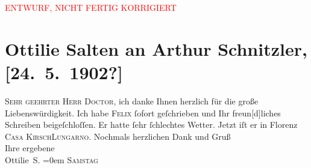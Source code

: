 
\begin{center}
            \textcolor{red}{ENTWURF, NICHT FERTIG KORRIGIERT}
                      \end{center}
            
         \renewcommand{\erwaehnteOrte}{Orte: Casa Kirsch, Wien}
         \renewcommand{\erwaehnteWerke}{}
               \section[Ottilie Salten an Arthur Schnitzler, {[}24. 5. 1902?{]}]{ Ottilie Salten an Arthur Schnitzler, {[}24. 5. 1902?{]}}\nopagebreak{}\rehead{ }\begin{ledgroupsized}[t]{13cm}\normalsize\beginnumbering \toendnotes[C]{\smallbreak\pagebreak[2]} 
\pstart
           \noindent{}{\pb}\textsc{Sehr geehrter Herr Doctor, } ich danke Ihnen herzlich für die große Liebenswürdigkeit. Ich habe \textsc{Felix} ſofort geſchrieben und Ihr
               freun{[}d{]}liches Schreiben beigeſchloſſen. Er hatte ſehr ſchlechtes
               Wetter. Jetzt iſt er in Florenz \textsc{Casa Kirsch}\textsc{Lungarno.}\pend
           \pstart
           Nochmals herzlichen Dank und Gruß{\\[\baselineskip]}Ihre ergebene {\\[\baselineskip]}\spacefill\mbox{Ottilie S.}\pend
           \leftskip=0em{}\pstart
           \textsc{Samstag}\pend
           
         
         \endnumbering{}\end{ledgroupsized}\begin{anhang}\end{anhang}\newcommand{\dateiname}{L03100}\newcommand{\titel}{Ottilie Salten an Arthur Schnitzler, [24. 5. 1902?]}\newcommand{\editorInnen}{Martin Anton Müller und Laura Untner}
      